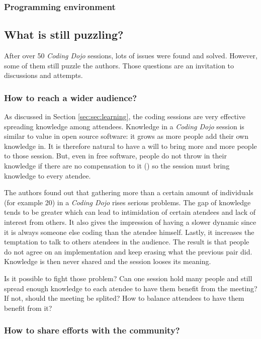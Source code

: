 \subsubsection{Programming environment}

\subsection{What is still puzzling?}\label{ssub:puzzles}

After over 50 \textit{Coding Dojo} sessions, lots of issues were found
and solved. However, some of them still puzzle the authors. Those
questions are an invitation to discussions and attempts.

\subsubsection{How to reach a wider audience?}

As discussed in Section \ref{sec:sec:learning}, the coding sessions
are very effective spreading knowledge among attendees. Knowledge in a
\textit{Coding Dojo} session is similar to value in open source
software: it grows as more people add their own knowledge in. It is
therefore natural to have a will to bring more and more people to
those session. But, even in free software, people do not throw in
their knowledge if there are no compensation to it
(\cite{RishabGhosh}) so the session must bring knowledge to every
atendee.

The authors found out that gathering more than a certain amount of
individuals (for example 20) in a \textit{Coding Dojo} rises serious
problems. The gap of knowledge tends to be greater which can lead to
intimidation of certain atendees and lack of interest from others. It
also gives the impression of having a slower dynamic since it is
always someone else coding than the atendee himself. Lastly, it
increases the temptation to talk to others atendees in the
audience. The result is that people do not agree on an implementation
and keep erasing what the previous pair did. Knowledge is then never
shared and the session looses its meaning.

Is it possible to fight those problem? Can one session hold many
people and still spread enough knowledge to each atendee to have them
benefit from the meeting? If not, should the meeting be splited? How
to balance attendees to have them benefit from it?

\subsubsection{How to share efforts with the community?}

